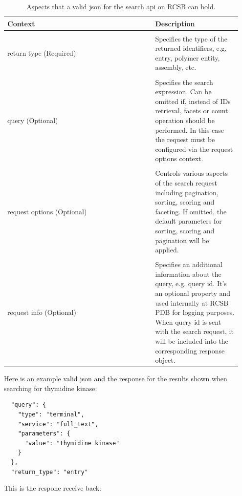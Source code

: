 \documentclass[]{final_report}
\begin{document}
\begin{table}[ht!]
    \begin{center}
        \label{tab:json}
        \begin{tabular}{p{0.6\linewidth}|p{0.35\linewidth}}
            Context & Description\\
            \hline
            \\
            return type (Required) & Specifies the type of the returned identifiers, e.g. entry, polymer entity, assembly, etc.
            \\
            \hline
            \\
            query (Optional) & Specifies the search expression. Can be omitted if, instead of IDs retrieval, facets or count operation should be performed. In this case the request must be configured via the request options context.
            \\
            \hline
            \\
            request options (Optional) & Controls various aspects of the search request including pagination, sorting, scoring and faceting. If omitted, the default parameters for sorting, scoring and pagination will be applied.
            \\
            \hline
            \\
            request info (Optional) & Specifies an additional information about the query, e.g. query id. It's an optional property and used internally at RCSB PDB for logging purposes. When query id is sent with the search request, it will be included into the corresponding response object.
        \end{tabular}
        \caption{\label{json}Aspects that a valid json for the search api on RCSB can hold.}
    \end{center}
\end{table}

\clearpage

Here is an example valid json and the response for the results shown when searching for thymidine kinase:

\begin{lstlisting}
  "query": {
    "type": "terminal",
    "service": "full_text",
    "parameters": {
      "value": "thymidine kinase"
    }
  },
  "return_type": "entry"
\end{lstlisting}

\vspace{40px}

This is the respone receive back:
\end{document}
